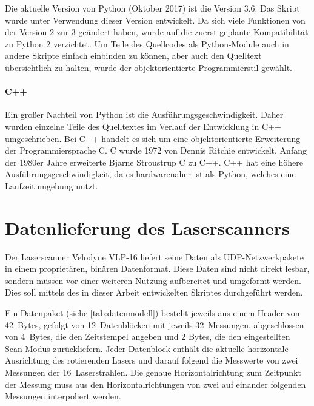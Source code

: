 \documentclass[a4paper,12pt,bibliography=totoc, listof=totoc,titlepage,pointlessnumbers]{scrreprt}
\begin{document}
Die aktuelle Version von Python (Oktober 2017) ist die Version 3.6. Das Skript wurde unter Verwendung dieser Version entwickelt. Da sich viele Funktionen von der Version 2 zur 3 geändert haben, wurde auf die zuerst geplante Kompatibilität zu Python 2 verzichtet. Um Teile des Quellcodes als Python-Module auch in andere Skripte einfach einbinden zu können, aber auch den Quelltext übersichtlich zu halten, wurde der objektorientierte Programmierstil gewählt.

\paragraph{C++}
Ein großer Nachteil von Python ist die Aus\-füh\-rungs\-ge\-schwin\-dig\-keit. Daher wurden einzelne Teile des Quelltextes im Verlauf der Entwicklung in C++ umgeschrieben.
Bei C++ handelt es sich um eine objektorientierte Erweiterung der Programmiersprache C. C wurde 1972 von Dennis Ritchie entwickelt. Anfang der 1980er Jahre erweiterte Bjarne Stroustrup C zu C++. C++ hat eine höhere Aus\-füh\-rungs\-ge\-schwin\-dig\-keit, da es hardwarenaher ist als Python, welches eine Laufzeitumgebung nutzt. \citep[S. 4f]{cpp}


\section{Datenlieferung des Laser\-scan\-ners}
\label{ss:Datenlieferung}
Der Laser\-scan\-ner Velodyne VLP-16 liefert seine Daten als UDP-Netzwerkpakete in einem proprietären, binären Datenformat. Diese Daten sind nicht direkt lesbar, sondern müssen vor einer weiteren Nutzung aufbereitet und umgeformt werden. Dies soll mittels des in dieser Arbeit entwickelten Skriptes durchgeführt werden.

Ein Datenpaket (siehe \autoref{tab:datenmodell}) besteht jeweils aus einem Header von 42~Bytes, gefolgt von 12~Datenblöcken mit jeweils 32~Messungen, abgeschlossen von 4~Bytes, die den Zeitstempel angeben und 2 Bytes, die den eingestellten Scan-Modus zurückliefern. Jeder Datenblock enthält die aktuelle horizontale Ausrichtung des rotierenden Lasers und darauf folgend die Messwerte von zwei Messungen der 16~Laserstrahlen. Die genaue Horizontalrichtung zum Zeitpunkt der Messung muss aus den Horizontalrichtungen von zwei auf einander folgenden Messungen interpoliert werden.
\end{document}
